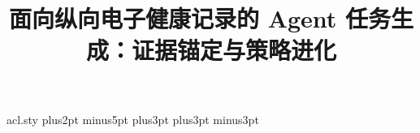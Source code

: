 \begin{filecontents*}{acl.sty}
\abovedisplayskip 7pt plus2pt minus5pt%
\belowdisplayskip \abovedisplayskip
\abovedisplayshortskip  0pt plus3pt%
\belowdisplayshortskip  4pt plus3pt minus3pt%

\def\@normalsize{\@setsize\normalsize{11pt}\xpt\@xpt}
\def\small{\@setsize\small{10pt}\ixpt\@ixpt}
\def\footnotesize{\@setsize\footnotesize{10pt}\ixpt\@ixpt}
\def\scriptsize{\@setsize\scriptsize{8pt}\viipt\@viipt}
\def\tiny{\@setsize\tiny{7pt}\vipt\@vipt}
\def\large{\@setsize\large{14pt}\xiipt\@xiipt}
\def\Large{\@setsize\Large{16pt}\xivpt\@xivpt}
\def\LARGE{\@setsize\LARGE{20pt}\xviipt\@xviipt}
\def\huge{\@setsize\huge{23pt}\xxpt\@xxpt}
\def\Huge{\@setsize\Huge{28pt}\xxvpt\@xxvpt}

\ifacl@hyperref
  \RequirePackage{hyperref}
  \hypersetup{colorlinks=true, citecolor=darkblue, linkcolor=darkblue, urlcolor=darkblue}
\else
  \def\href#1#2{{#2}}
  \usepackage{url}
\fi

\end{filecontents*}
\documentclass[11pt,a4paper]{article}
\usepackage[UTF8,scheme=plain,fontset=fandol]{ctex}
\usepackage[preprint]{acl}
\setmainfont{texgyretermes-regular.otf}[BoldFont=texgyretermes-bold.otf,ItalicFont=texgyretermes-italic.otf,BoldItalicFont=texgyretermes-bolditalic.otf]
\setsansfont{texgyreheros-regular.otf}[BoldFont=texgyreheros-bold.otf,ItalicFont=texgyreheros-italic.otf,BoldItalicFont=texgyreheros-bolditalic.otf]
\setmonofont{lmmono10-regular.otf}[Scale=MatchLowercase]
\usepackage{amsmath,amssymb}
\usepackage{graphicx,booktabs,tabularx,array}
\usepackage{fvextra}
\usepackage{enumitem}
\usepackage{microtype}
\usepackage{placeins,stfloats}
\usepackage{xurl}
\renewcommand{\abstractname}{摘要}
\renewcommand{\figurename}{图}
\renewcommand{\tablename}{表}
\renewcommand{\refname}{参考文献}
\setlength{\titlebox}{4\baselineskip}
\setlength{\parindent}{2em}
\setlength{\emergencystretch}{2em}
\captionsetup{labelsep=period}
\makeatletter
\setlength{\@fptop}{0pt}
\setlength{\@fpsep}{12pt}
\setlength{\@fpbot}{0pt plus 1fil}
\setlength{\@dblfptop}{0pt}
\setlength{\@dblfpsep}{12pt}
\setlength{\@dblfpbot}{0pt plus 1fil}
\makeatother
{}
\title{面向纵向电子健康记录的 Agent 任务生成：证据锚定与策略进化}
\author{}
\date{}

